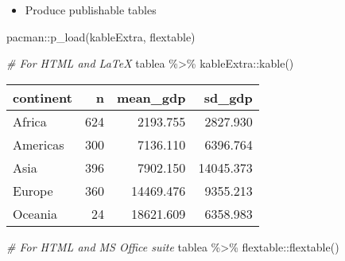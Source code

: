 \documentclass[
]{book}
\newenvironment{Shaded}{\begin{snugshade}}{\end{snugshade}}
\newcommand{\CommentTok}[1]{\textcolor[rgb]{0.56,0.35,0.01}{\textit{#1}}}
\newcommand{\FunctionTok}[1]{\textcolor[rgb]{0.00,0.00,0.00}{#1}}
\newcommand{\NormalTok}[1]{#1}
\newcommand{\SpecialCharTok}[1]{\textcolor[rgb]{0.00,0.00,0.00}{#1}}
\providecommand{\tightlist}{%
  \setlength{\itemsep}{0pt}\setlength{\parskip}{0pt}}
\begin{document}
\begin{itemize}
\tightlist
\item
  Produce publishable tables
\end{itemize}

\begin{Shaded}
\begin{Highlighting}[]
\NormalTok{pacman}\SpecialCharTok{::}\FunctionTok{p\_load}\NormalTok{(kableExtra,}
\NormalTok{               flextable)}

\CommentTok{\# For HTML and LaTeX}
\NormalTok{tablea }\SpecialCharTok{\%\textgreater{}\%}\NormalTok{ kableExtra}\SpecialCharTok{::}\FunctionTok{kable}\NormalTok{()}
\end{Highlighting}
\end{Shaded}

\begin{tabular}{l|r|r|r}
\hline
continent & n & mean\_gdp & sd\_gdp\\
\hline
Africa & 624 & 2193.755 & 2827.930\\
\hline
Americas & 300 & 7136.110 & 6396.764\\
\hline
Asia & 396 & 7902.150 & 14045.373\\
\hline
Europe & 360 & 14469.476 & 9355.213\\
\hline
Oceania & 24 & 18621.609 & 6358.983\\
\hline
\end{tabular}

\begin{Shaded}
\begin{Highlighting}[]
\CommentTok{\# For HTML and MS Office suite}
\NormalTok{tablea }\SpecialCharTok{\%\textgreater{}\%}\NormalTok{ flextable}\SpecialCharTok{::}\FunctionTok{flextable}\NormalTok{()}
\end{Highlighting}
\end{Shaded}

\providecommand{\docline}[3]{\noalign{\global\setlength{\arrayrulewidth}{#1}}\arrayrulecolor[HTML]{#2}\cline{#3}}

\setlength{\tabcolsep}{2pt}

\renewcommand*{\arraystretch}{1.5}
\end{document}
